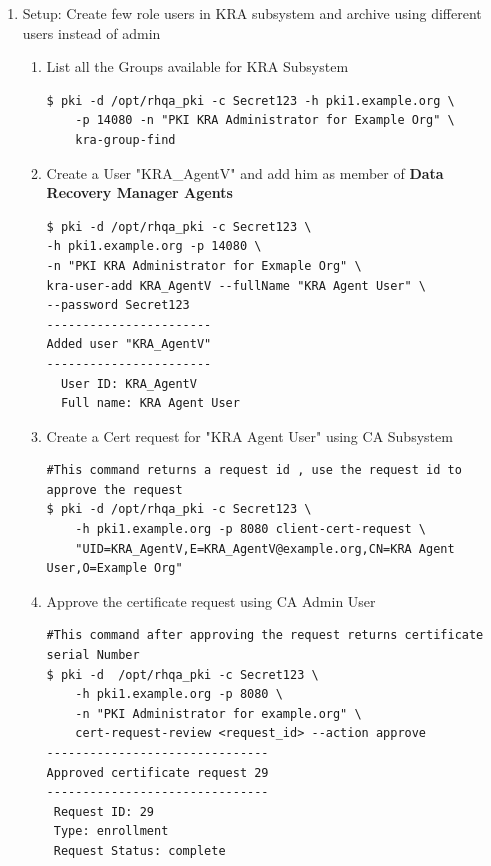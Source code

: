 \documentclass[a4paper]{article}
\begin{document}
\begin{enumerate}[label*=\arabic*.]
\begin{enumerate}[label*=\arabic*.]
                \item Setup: Create few role users in KRA subsystem and archive using different users instead of admin
                    \begin{enumerate}[label*=\arabic*.]
                        \item List all the Groups available for KRA Subsystem
                            \begin{lstlisting}[style=bashInputStyle]
$ pki -d /opt/rhqa_pki -c Secret123 -h pki1.example.org \
    -p 14080 -n "PKI KRA Administrator for Example Org" \
    kra-group-find                                
                            \end{lstlisting}
                        \item Create a User "KRA\_AgentV" and add him as member of \textbf{Data Recovery Manager Agents} 
                            \begin{lstlisting}[style=bashInputStyle]
$ pki -d /opt/rhqa_pki -c Secret123 \
-h pki1.example.org -p 14080 \
-n "PKI KRA Administrator for Exmaple Org" \
kra-user-add KRA_AgentV --fullName "KRA Agent User" \
--password Secret123
-----------------------
Added user "KRA_AgentV"
-----------------------
  User ID: KRA_AgentV
  Full name: KRA Agent User
                            \end{lstlisting}
                        \item Create a Cert request for "KRA Agent User" using CA Subsystem 
                            \begin{lstlisting}[style=bashInputStyle]
#This command returns a request id , use the request id to approve the request
$ pki -d /opt/rhqa_pki -c Secret123 \
    -h pki1.example.org -p 8080 client-cert-request \
    "UID=KRA_AgentV,E=KRA_AgentV@example.org,CN=KRA Agent User,O=Example Org" 
                            \end{lstlisting}
                        \item Approve the certificate request using CA Admin User
                            \begin{lstlisting}[style=bashInputStyle]
#This command after approving the request returns certificate serial Number
$ pki -d  /opt/rhqa_pki -c Secret123 \
    -h pki1.example.org -p 8080 \
    -n "PKI Administrator for example.org" \
    cert-request-review <request_id> --action approve
-------------------------------
Approved certificate request 29
-------------------------------
 Request ID: 29
 Type: enrollment
 Request Status: complete

\end{lstlisting}
\end{enumerate}
\end{enumerate}
\end{enumerate}
\end{document}
